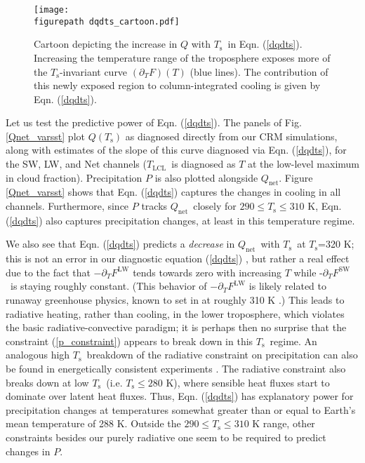 \documentclass[10pt]{article}
\newcommand{\eqnref}[1]{(\ref{#1})}
\newcommand{\ppt}{\ensuremath{\partial_T}}
\newcommand{\Qnet}{\ensuremath{Q_\mathrm{net}}}
\newcommand{\FLW}{\ensuremath{F^\mathrm{LW}}}
\newcommand{\FSW}{\ensuremath{F^\mathrm{SW}}}
\newcommand{\Ts}{\ensuremath{T_\mathrm{s}}}
\newcommand{\Tlcl}{\ensuremath{T_\mathrm{LCL}}}
\newcommand{\figurepath}{../figures/}
\begin{document}
\begin{figure}[t]
	\begin{center}
			\texttt{[image: \\figurepath dqdts\_cartoon.pdf]}
		\caption{Cartoon depicting the increase in $Q$ with \Ts\ in Eqn. \eqnref{dqdts}. Increasing the temperature range of the troposphere  exposes more of the \Ts-invariant curve $(\ppt F)(T)$ (blue lines). The contribution  of this newly exposed region to column-integrated cooling is given by Eqn. \eqnref{dqdts}.
		\label{dqdts_cartoon}
		}
	\end{center}
\end{figure}


Let us test the predictive power of Eqn. \eqnref{dqdts}. The panels of Fig. \ref{Qnet_varsst} plot $Q(\Ts)$ as diagnosed directly from our CRM simulations, along with estimates of the slope of this curve diagnosed via  Eqn. \eqnref{dqdts}, for the SW, LW, and Net  channels (\Tlcl\ is diagnosed as $T$ at the low-level maximum in cloud fraction). Precipitation $P$ is also plotted alongside $\Qnet$.  Figure \ref{Qnet_varsst} shows that  Eqn. \eqnref{dqdts}  captures the changes in  cooling in all channels. Furthermore, since $P$ tracks \Qnet\ closely for $290\leq \Ts \leq 310$ K, Eqn. \eqnref{dqdts} also captures precipitation changes, at least in this temperature regime.

We also see that  Eqn. \eqnref{dqdts} predicts a \emph{decrease} in  \Qnet\ with \Ts\ at \Ts=320 K; this is not an error in our diagnostic equation \eqnref{dqdts} , but rather a real effect due to the fact that $-\ppt \FLW$ tends towards zero with increasing $T$  while -\ppt \FSW\ is staying roughly constant. (This behavior of $-\ppt \FLW$ is likely related to runaway greenhouse physics, known to set in at roughly 310 K \citep{goldblatt2013}.) This leads to radiative heating, rather than cooling, in the  lower troposphere, which violates the basic radiative-convective paradigm; it is perhaps then no surprise that the constraint \eqnref{p_constraint} appears to break down in this \Ts\ regime. An analogous high \Ts\ breakdown of the radiative constraint on precipitation can also be found in energetically consistent experiments \citep{lehir2009, pierrehumbert1999}.  The radiative  constraint  also breaks down at low \Ts\ (i.e. $\Ts \leq 280$ K), where sensible heat fluxes start to dominate over latent heat fluxes. Thus, Eqn. \eqnref{dqdts} has explanatory power for  precipitation changes at  temperatures somewhat greater than or equal to Earth's mean temperature of 288 K. Outside the $290\leq \Ts \leq 310$ K range, other constraints besides our purely radiative one seem to be required to predict changes in $P$.
\end{document}
